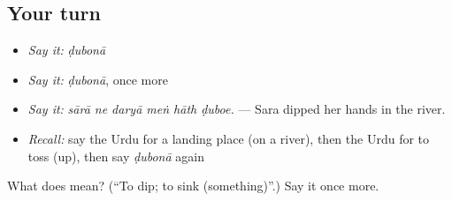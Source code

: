 \subsection*{Your turn}
\begin{itemize}
\raggedright
  \item \emph{Say it:} \emph{ḍubonā}
  \item \emph{Say it:} \emph{ḍubonā}, once more
  \item \emph{Say it:} \emph{sārā ne daryā meṅ hāth ḍuboe.} — Sara dipped her hands in the river.
  \item \emph{Recall:} say the Urdu for a landing place (on a river), then the Urdu for to toss (up), then say \emph{ḍubonā} again
\end{itemize}

\begin{tcolorbox}[breakable,colback=teal!4,colframe=teal!35!black,title={Before you move on}]
What does  mean? (\textquotedblleft{}To dip; to sink (something)\textquotedblright{}.) Say it once more.
\end{tcolorbox}
